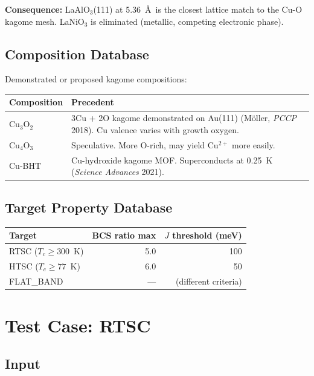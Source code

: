 \documentclass[11pt, a4paper]{article}
\begin{document}
\textbf{Consequence:} LaAlO$_3$(111) at 5.36~\AA\ is the closest
lattice match to the Cu-O kagome mesh. LaNiO$_3$ is eliminated
(metallic, competing electronic phase).

\subsection{Composition Database}

Demonstrated or proposed kagome compositions:

\begin{center}
\begin{tabular}{@{}lp{8cm}@{}}
\toprule
\textbf{Composition} & \textbf{Precedent} \\
\midrule
Cu$_3$O$_2$ & 3Cu + 2O kagome demonstrated on Au(111)
  (M\"oller, \textit{PCCP} 2018). Cu valence varies with
  growth oxygen. \\
Cu$_4$O$_3$ & Speculative. More O-rich, may yield Cu$^{2+}$
  more easily. \\
Cu-BHT & Cu-hydroxide kagome MOF. Superconducts at 0.25~K
  (\textit{Science Advances} 2021). \\
\bottomrule
\end{tabular}
\end{center}

\subsection{Target Property Database}

\begin{center}
\begin{tabular}{@{}lrr@{}}
\toprule
\textbf{Target} & \textbf{BCS ratio max} &
\textbf{$J$ threshold (meV)} \\
\midrule
RTSC ($T_c \geq 300$~K) & 5.0 & 100 \\
HTSC ($T_c \geq 77$~K) & 6.0 & 50 \\
FLAT\_BAND & --- & (different criteria) \\
\bottomrule
\end{tabular}
\end{center}

\section{Test Case: RTSC}

\subsection{Input}
\end{document}
